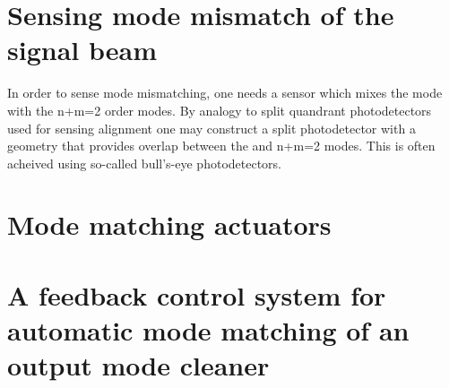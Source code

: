 
\section{Sensing mode mismatch of the signal beam}
In order to sense mode mismatching, one needs a sensor which mixes the  mode with the n+m=2 order modes. %
By analogy to split quandrant photodetectors used for sensing alignment one may construct a split photodetector with a geometry that provides overlap between the  and n+m=2 modes. %
This is often acheived using so-called bull's-eye photodetectors.


\section{Mode matching actuators}




\section{A feedback control system for automatic mode matching of an output mode cleaner}
